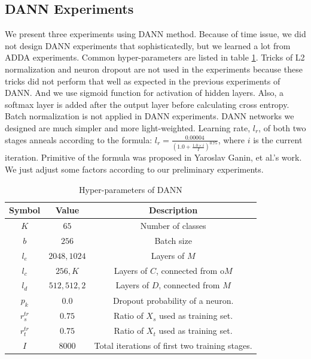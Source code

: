 \documentclass[conference]{IEEEtran}
\begin{document}
\subsection{DANN Experiments}
We present three experiments using DANN method. Because of time issue, we did not design DANN experiments that sophisticatedly, but we learned a lot from ADDA experiments. Common hyper-parameters are listed in table \ref{tab:SymDANN}. Tricks of L2 normalization and neuron dropout are not used in the experiments because these tricks did not perform that well as expected in the previous experiments of DANN. And we use sigmoid function for activation of hidden layers. Also, a softmax layer is added after the output layer before calculating cross entropy. Batch normalization is not applied in DANN experiments. DANN networks we designed are much simpler and more light-weighted. Learning rate, $l_r$, of both two stages anneals according to the formula: $l_r= \frac{0.00004}{ (1.0 + \frac{1.0 \times i}{I})^{0.75}}$, where $i$ is the current iteration. Primitive of the formula was proposed in Yaroslav Ganin, et al.'s work. We just adjust some factors according to our preliminary experiments.
 \begin{table}[h]
	\centering
	\caption{Hyper-parameters of DANN}
	\label{tab:SymDANN}
	\begin{tabular}{ccc}
		\hline
		Symbol & Value & Description \\
		\hline
		\hline
        $K$ & $65$ & Number of classes \\
		$b$ & $256$ & Batch size \\
		$l_e$ & ${2048,1024}$ & Layers of $M$ \\
		$l_c$ & ${256,K}$ & Layers of $C$, connected from o$M$  \\
		$l_d$ & ${512,512,2}$ & Layers of $D$, connected from $M$ \\
        $p_k$ & $0.0$ & Dropout probability of a neuron. \\
        $r^{tr}_{s}$ & $0.75$ & Ratio of $X_s$ used as training set.\\
        $r^{tr}_{t}$ & $0.75$ & Ratio of $X_t$ used as training set.  \\
        $I$ & $8000$ & Total iterations of first two training stages.   \\
		\hline
	\end{tabular}
\end{table}
\end{document}
